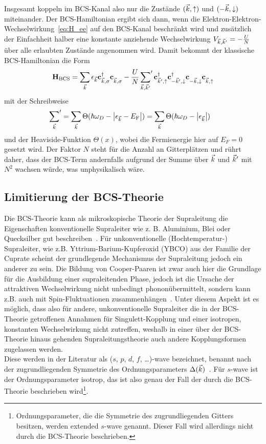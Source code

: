 Insgesamt koppeln im BCS-Kanal also nur die Zustände $({\vec{k}}, \uparrow)$ und $(-{\vec{k}}, \downarrow)$ miteinander.
Der BCS-Hamiltonian ergibt sich dann, wenn die Elektron-Elektron-Wechselwirkung~\eqref{eq:H_ee} auf den BCS-Kanal beschränkt wird und zusätzlich der Einfachheit halber eine konstante anziehende Wechselwirkung $V_{{\vec{k}}, {\vec{k}}'} = -\frac{U}{N}$ über alle erlaubten Zustände angenommen wird.
Damit bekommt der klassische BCS-Hamiltonian die Form
\begin{align}
    \oH_{\text{BCS}} = \sum_{\vk} \epsilon_\vk \ofed{\vk, \sigma} \ofe{\vk, \sigma} - \frac{U}{N} \sump{\vk, \vk'}\ofed{\vk', \up} \ofed{-\vk', \down} \ofe{-\vk, \down} \ofe{\vk, \up}
    \label{eq:BCS}
\end{align}
mit der Schreibweise 
\begin{align}
    \sideset{}{'}\sum_{{\vec{k}}} &= \sum_{{\vec{k}}} \Theta(\hbar \omega_D - \abs{\epsilon_{\vec{k}} - E_\text{F}}) = \sum_{{\vec{k}}} \Theta(\hbar \omega_D - \abs{\epsilon_{\vec{k}}})
\end{align}
und der Heaviside-Funktion $\Theta(x)$, wobei die Fermienergie hier auf $E_F = 0$ gesetzt wird. 
Der Faktor $N$ steht für die Anzahl an Gitterplätzen und rührt daher, dass der BCS-Term andernfalls aufgrund der Summe über ${\vec{k}}$ und ${\vec{k}}'$ mit $N^2$ wachsen würde, was unphysikalisch wäre.






\subsection{Limitierung der BCS-Theorie}
Die BCS-Theorie kann als mikroskopische Theorie der Supraleitung die Eigenschaften konventionelle Supraleiter wie z. B. Aluminium, Blei oder Quecksilber gut beschreiben~\cite{webb_superconductivity_2015}. 
Für unkonventionelle (Hochtemperatur-) Supraleiter, wie z.B. Yttrium-Barium-Kupferoxid (YBCO) aus der Familie der Cuprate scheint der grundlegende Mechanismus der Supraleitung jedoch ein anderer zu sein. 
Die Bildung von Cooper-Paaren ist zwar auch hier die Grundlage für die Ausbildung einer supraleitenden Phase, jedoch ist die Ursache der attraktiven Wechselwirkung nicht unbedingt phononübermittelt, sondern kann z.B. auch mit Spin-Fluktuationen zusammenhängen~\cite{cao_unconventional_2018,czycholl_theoretische_2017}.
Unter diesem Aspekt ist es möglich, dass also für andere, unkonventionelle Supraleiter die in der BCS-Theorie getroffenen Annahmen für Singulett-Kopplung und einer isotropen, konstanten Wechselwirkung nicht zutreffen, weshalb in einer über der BCS-Theorie hinaus gehenden Supraleitungstheorie auch andere Kopplungsformen zugelassen werden. \\
Diese werden in der Literatur als ($s$, $p$, $d$, $f$, \dots)-wave bezeichnet, benannt nach der zugrundliegenden Symmetrie des Ordnungsparameters $\Delta({\vec{k}})$~\cite{sigrist_phenomenological_1991}. 
Für $s$-wave ist der Ordnungsparameter isotrop, das ist also genau der Fall der durch die BCS-Theorie beschrieben wird\footnote{Ordnungsparameter, die die Symmetrie des zugrundliegenden Gitters besitzen, werden \glqq extended $s$-wave \grqq genannt. Dieser Fall wird allerdings nicht durch die BCS-Theorie beschrieben.}.